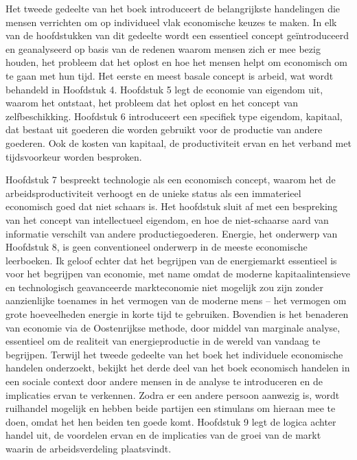 Het tweede gedeelte van het boek introduceert de belangrijkste handelingen die mensen verrichten om op individueel vlak economische keuzes te maken. In elk van de hoofdstukken van dit gedeelte wordt een essentieel concept geïntroduceerd en geanalyseerd op basis van de redenen waarom mensen zich er mee bezig houden, het probleem dat het oplost en hoe het mensen helpt om economisch om te gaan met hun tijd. Het eerste en meest basale concept is arbeid, wat wordt behandeld in Hoofdstuk 4. Hoofdstuk 5 legt de economie van eigendom uit, waarom het ontstaat, het probleem dat het oplost en het concept van zelfbeschikking. Hoofdstuk 6 introduceert een specifiek type eigendom, kapitaal, dat bestaat uit goederen die worden gebruikt voor de productie van andere goederen. Ook de kosten van kapitaal, de productiviteit ervan en het verband met tijdsvoorkeur worden besproken.

Hoofdstuk 7 bespreekt technologie als een economisch concept, waarom het de arbeidsproductiviteit verhoogt en de unieke status als een immaterieel economisch goed dat niet schaars is. Het hoofdstuk sluit af met een bespreking van het concept van intellectueel eigendom, en hoe de niet-schaarse aard van informatie verschilt van andere productiegoederen.
Energie, het onderwerp van Hoofdstuk 8, is geen conventioneel onderwerp in de meeste economische leerboeken. Ik geloof echter dat het begrijpen van de energiemarkt essentieel is voor het begrijpen van economie, met name omdat de moderne kapitaalintensieve en technologisch geavanceerde markteconomie niet mogelijk zou zijn zonder aanzienlijke toenames in het vermogen van de moderne mens – het vermogen om grote hoeveelheden energie in korte tijd te gebruiken. Bovendien is het benaderen van economie via de Oostenrijkse methode, door middel van marginale analyse, essentieel om de realiteit van energieproductie in de wereld van vandaag te begrijpen.
Terwijl het tweede gedeelte van het boek het individuele economische handelen onderzoekt, bekijkt het derde deel van het boek economisch handelen in een sociale context door andere mensen in de analyse te introduceren en de implicaties ervan te verkennen. Zodra er een andere persoon aanwezig is, wordt ruilhandel mogelijk en hebben beide partijen een stimulans om hieraan mee te doen, omdat het hen beiden ten goede komt. Hoofdstuk 9 legt de logica achter handel uit, de voordelen ervan en de implicaties van de groei van de markt waarin de arbeidsverdeling plaatsvindt.

